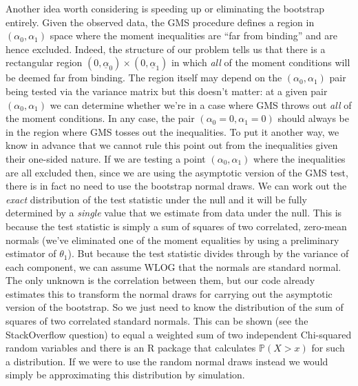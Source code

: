 \documentclass[12pt]{article}
\begin{document}
Another idea worth considering is speeding up or eliminating the bootstrap entirely.
Given the observed data, the GMS procedure defines a region in $(\alpha_0, \alpha_1)$ space where the moment inequalities are ``far from binding'' and are hence excluded.
Indeed, the structure of our problem tells us that there is a rectangular region $(0, \underline{\alpha}_0) \times (0, \underline{\alpha}_1)$ in which \emph{all} of the moment conditions will be deemed far from binding.
The region itself may depend on the $(\alpha_0, \alpha_1)$ pair being tested via the variance matrix but this doesn't matter: at a given pair $(\alpha_0, \alpha_1)$ we can determine whether we're in a case where GMS throws out \emph{all} of the moment conditions.
In any case, the pair $(\alpha_0 = 0, \alpha_1 = 0)$ should always be in the region where GMS tosses out the inequalities.
To put it another way, we know in advance that we cannot rule this point out from the inequalities given their one-sided nature.
If we are testing a point $(\alpha_0, \alpha_1)$ where the inequalities are all excluded  then, since we are using the asymptotic version of the GMS test, there is in fact no need to use the bootstrap normal draws.
We can work out the \emph{exact} distribution of the test statistic under the null and it will be fully determined by a \emph{single} value that we estimate from data under the null.
This is because the test statistic is simply a sum of squares of two correlated, zero-mean normals (we've eliminated one of the moment equalities by using a preliminary estimator of $\theta_1$).
But because the test statistic divides through by the variance of each component, we can assume WLOG that the normals are standard normal.
The only unknown is the correlation between them, but our code already estimates this to transform the normal draws for carrying out the asymptotic version of the bootstrap.
So we just need to know the distribution of the sum of squares of two correlated standard normals.
This can be shown (see the StackOverflow question) to equal a weighted sum of two independent Chi-squared random variables and there is an R package that calculates $\mathbb{P}(X>x)$ for such a distribution.
If we were to use the random normal draws instead we would simply be approximating this distribution by simulation.
\end{document}

